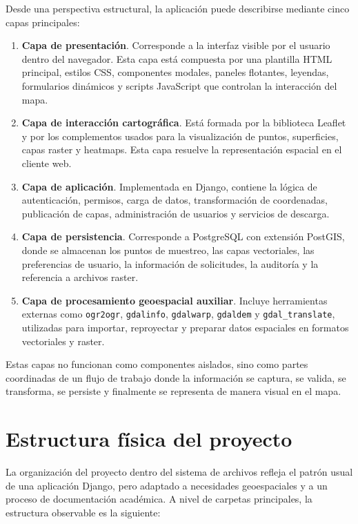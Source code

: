 \documentclass[12pt,a4paper]{report}
\begin{document}
Desde una perspectiva estructural, la aplicaci\'on puede describirse mediante cinco capas principales:

\begin{enumerate}
    \item \textbf{Capa de presentaci\'on}. Corresponde a la interfaz visible por el usuario dentro del navegador. Esta capa est\'a compuesta por una plantilla HTML principal, estilos CSS, componentes modales, paneles flotantes, leyendas, formularios din\'amicos y scripts JavaScript que controlan la interacci\'on del mapa.
    \item \textbf{Capa de interacci\'on cartogr\'afica}. Est\'a formada por la biblioteca Leaflet y por los complementos usados para la visualizaci\'on de puntos, superficies, capas raster y heatmaps. Esta capa resuelve la representaci\'on espacial en el cliente web.
    \item \textbf{Capa de aplicaci\'on}. Implementada en Django, contiene la l\'ogica de autenticaci\'on, permisos, carga de datos, transformaci\'on de coordenadas, publicaci\'on de capas, administraci\'on de usuarios y servicios de descarga.
    \item \textbf{Capa de persistencia}. Corresponde a PostgreSQL con extensi\'on PostGIS, donde se almacenan los puntos de muestreo, las capas vectoriales, las preferencias de usuario, la informaci\'on de solicitudes, la auditor\'ia y la referencia a archivos raster.
    \item \textbf{Capa de procesamiento geoespacial auxiliar}. Incluye herramientas externas como \texttt{ogr2ogr}, \texttt{gdalinfo}, \texttt{gdalwarp}, \texttt{gdaldem} y \texttt{gdal\_translate}, utilizadas para importar, reproyectar y preparar datos espaciales en formatos vectoriales y raster.
\end{enumerate}

Estas capas no funcionan como componentes aislados, sino como partes coordinadas de un flujo de trabajo donde la informaci\'on se captura, se valida, se transforma, se persiste y finalmente se representa de manera visual en el mapa.

\section{Estructura f\'isica del proyecto}

La organizaci\'on del proyecto dentro del sistema de archivos refleja el patr\'on usual de una aplicaci\'on Django, pero adaptado a necesidades geoespaciales y a un proceso de documentaci\'on acad\'emica. A nivel de carpetas principales, la estructura observable es la siguiente:
\end{document}
